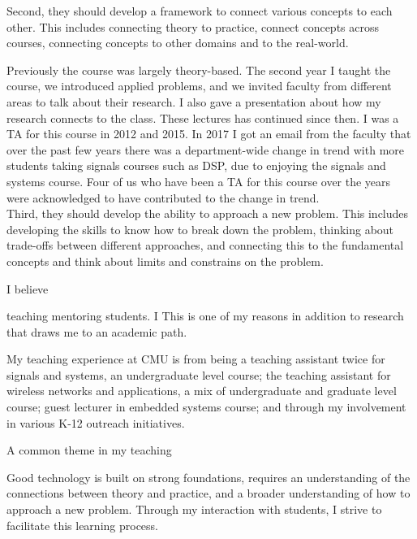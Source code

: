 \documentclass[10pt]{article}
\begin{document}
Second, they should develop a framework to connect various concepts to each other. This includes connecting theory to practice, connect concepts across courses, connecting concepts to other domains and to the real-world.

Previously the course was largely theory-based. The second year I taught the course, we introduced applied problems, and we invited faculty from different areas to talk about their research. I also gave a presentation about how my research connects to the class. These lectures has continued since then. I was a TA for this course in 2012 and 2015. In 2017 I got an email from the faculty that over the past few years there was a department-wide change in trend with more students taking signals courses such as DSP, due to enjoying the signals and systems course. Four of us who have been a TA for this course over the years were acknowledged to have contributed to the change in trend.\\

Third, they should develop the ability to approach a new problem. This includes developing the skills to know how to break down the problem, thinking about trade-offs between different approaches, and connecting this to the fundamental concepts and think about limits and constrains on the problem.





I believe 

 teaching
mentoring students. I This is one of my reasons in addition to research that draws me to an academic path. 

My teaching experience at CMU is from being a teaching assistant twice for signals and systems, an undergraduate level course; the teaching assistant for wireless networks and applications, a mix of undergraduate and graduate level course; guest lecturer in embedded systems course; and through my involvement in various K-12 outreach initiatives.

A common theme in my teaching 


Good technology is built on strong foundations, requires an understanding of the connections between theory and practice, and a broader understanding of how to approach a new problem.  Through my interaction with students, I strive to facilitate this learning process.
\end{document}
